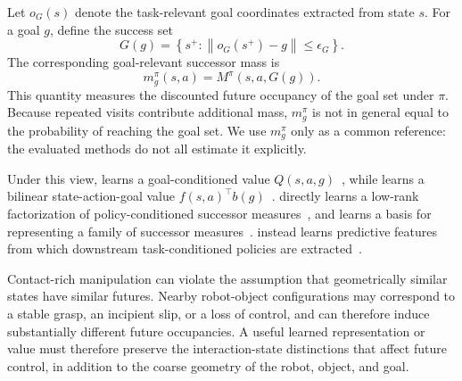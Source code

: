 Let $o_G(s)$ denote the task-relevant goal coordinates extracted from state $s$.
For a goal $g$, define the success set
\begin{equation}
    G(g) = \left\{ s^+ : \left\|o_G(s^+) - g\right\| \leq \epsilon_G \right\}.
\end{equation}
The corresponding goal-relevant successor mass is
\begin{equation}
    m^\pi_g(s,a) = M^\pi\!\left(s,a,G(g)\right).
\end{equation}
This quantity measures the discounted future occupancy of the goal set under $\pi$.
Because repeated visits contribute additional mass, $m_g^\pi$ is not in general equal to the probability of reaching the goal set.
We use $m^\pi_g$ only as a common reference: the evaluated methods do not all estimate it explicitly.

Under this view, \gciql{} learns a goal-conditioned value $Q(s,a,g)$~\citep{park-iclr25a},
while \crl{} learns a bilinear state-action-goal value $f(s,a)^\top b(g)$~\citep{eysenbach-neurips22a}.
\fb{} directly learns a low-rank factorization of policy-conditioned successor measures~\citep{touati-neurips21a,touati-iclr23a},
and \psm{} learns a basis for representing a family of successor measures~\citep{agarwal-arxiv25a}.
\rldp{} instead learns predictive features from which downstream task-conditioned policies are extracted~\citep{jajoo-iclr26a}.

Contact-rich manipulation can violate the assumption that geometrically similar states have similar futures.
Nearby robot-object configurations may correspond to a stable grasp, an incipient slip, or a loss of control, and can therefore induce substantially different future occupancies.
A useful learned representation or value must therefore preserve the interaction-state distinctions that affect future control, in addition to the
coarse geometry of the robot, object, and goal.
